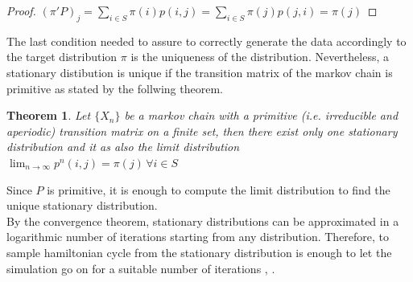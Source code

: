 \documentclass{article}
\newtheorem{theorem}{Theorem}
\begin{document}
\begin{proof}
$ (\pi'P)_j = \sum_{i \in S} \pi(i)p(i,j) = \sum_{i \in S} \pi(j)p(j,i) = \pi(j) $ 
\end{proof}
\noindent The last condition needed to assure to correctly generate the data accordingly to the target distribution $\pi$ is the uniqueness of the distribution. Nevertheless, a stationary distibution is unique if the transition matrix of the markov chain is primitive as stated by the follwing theorem.
\begin{theorem}
Let $\{X_n\}$ be a markov chain with a primitive (i.e. irreducible and aperiodic) transition matrix on a finite set, then  there exist only one stationary distribution and it as also the limit distribution $\lim_{n \to \infty} p^n(i,j) = \pi(j)\,  \forall i \in S$
\end{theorem}
\noindent Since $P$ is primitive, it is enough to compute the limit distribution to find the unique stationary distribution. \\
By the convergence theorem, stationary distributions can be approximated in a logarithmic number of iterations starting from any distribution. Therefore, to sample hamiltonian cycle from the stationary distribution is enough to let the simulation go on for a suitable number of iterations \cite{mctheory}, \cite{mcalgorithm}. \\
\end{document}
